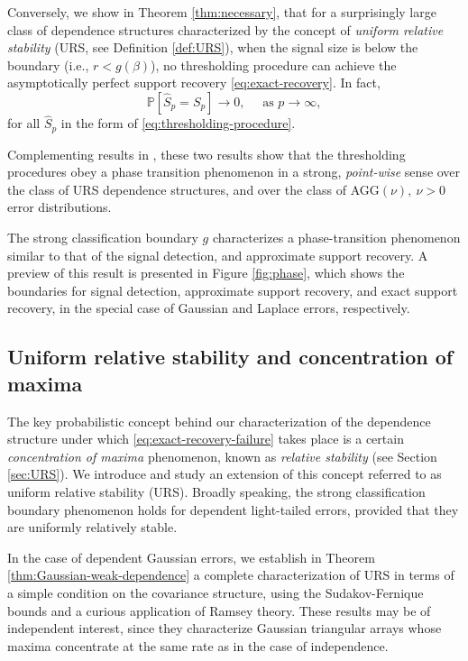 Conversely, we show in Theorem \ref{thm:necessary}, that for a surprisingly large class of dependence structures characterized by the concept of \emph{uniform relative stability} (URS, see Definition \ref{def:URS}), when the signal size is below the boundary  (i.e., $r<g(\beta)$), no thresholding procedure can achieve the asymptotically perfect support recovery \eqref{eq:exact-recovery}. In fact,
\begin{equation} \label{eq:exact-recovery-failure}
    \mathbb{P}\left[\widehat{S}_p=S_p\right]\longrightarrow 0,\quad \mbox{ as }p\to \infty,
\end{equation}
for all $\widehat{S}_p$ in the form of \eqref{eq:thresholding-procedure}.

Complementing results in \citet{butucea2018variable}, these two results show that the thresholding procedures obey a phase transition phenomenon in a strong, \emph{point-wise} sense over the class of URS dependence structures, and over the class of AGG$(\nu),\ \nu>0$ error distributions. 

The strong classification boundary $g$ characterizes a phase-transition phenomenon similar to that of the signal detection, and approximate support recovery. 
A preview of this result is presented in Figure \ref{fig:phase}, which shows the boundaries for signal detection, approximate support recovery, and exact support recovery, in the special case of Gaussian and Laplace errors, respectively. 

\subsection{Uniform relative stability and concentration of maxima}
\label{subsec:role-of-URS}
The key probabilistic concept behind our characterization of the dependence structure under which \eqref{eq:exact-recovery-failure} takes place is a certain {\em concentration of maxima} phenomenon, known as {\em relative stability} (see Section \ref{sec:URS}).
We introduce and study an extension of this concept referred to as uniform relative stability (URS). 
Broadly speaking, the strong classification boundary phenomenon holds for dependent light-tailed errors, provided that they are uniformly relatively stable. 

In the case of dependent Gaussian errors, we establish in Theorem \ref{thm:Gaussian-weak-dependence} a complete characterization of URS in terms of a simple condition on the covariance structure, using the Sudakov-Fernique bounds and a curious application of Ramsey theory.
These results may be of independent interest, since they characterize Gaussian triangular arrays whose maxima concentrate at the same rate as in the case of independence.

